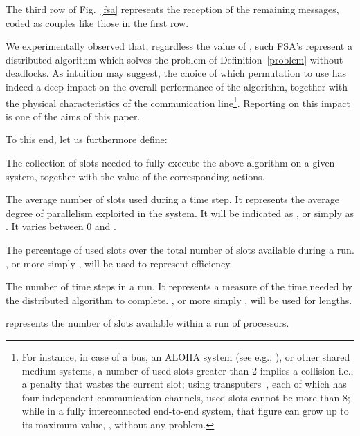 \documentclass{elsart}
\begin{document}
The third row of Fig.~\ref{fsa} represents the reception of the remaining  messages, 
coded as  couples like those in the first row.

We experimentally observed that, regardless the value of , such FSA's
represent a distributed algorithm which solves the problem of
Definition~\ref{problem} without deadlocks.
As intuition may suggest, the choice of which permutation to use has
indeed a deep impact
on the overall performance of the algorithm, together
with the physical characteristics of the communication 
line\footnote{For instance, in case of a bus, 
	      an ALOHA system (see e.g., \cite{Tan96}), or
	      other shared medium systems,
              a number of used slots greater than 2 implies a collision 
              i.e., a penalty that wastes the current slot; using
	      transputers~\cite{Gra90}, each of which has
	      four independent communication channels,
              used slots cannot be more than 8; while in a 
              fully interconnected end-to-end system, that figure
              can grow up to its maximum value, , 
	      without any problem.}.
Reporting on this impact is one of the aims of this paper. 

To this end, let us furthermore define:

\begin{defn}[run]
The collection of slots needed to fully execute the above algorithm on a 
given system, together with the value of the corresponding actions.
\end{defn}

\begin{defn}
The average number of slots used during a time step. It represents
the average degree of parallelism exploited in the system.
It will be indicated as , or simply as . It varies between 0
and .
\end{defn}

\begin{defn}[efficiency]
The percentage of used slots over the total number of slots 
available during a run. , or more simply , will
be used to represent efficiency.
\end{defn}

\begin{defn}[length]
The number of time steps in a run. It represents a measure
of the time needed by the distributed algorithm to complete.
, or more simply , will be used for lengths.
\end{defn}

\begin{defn}
 represents the number of slots 
available within a run of  processors.\label{sigma}
\end{defn}
\end{document}
